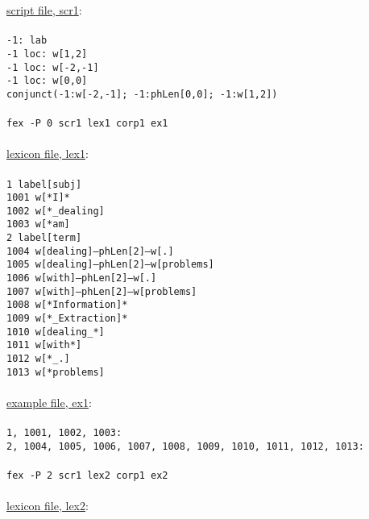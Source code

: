 \documentclass[11pt]{article}
\begin{document}
\underline{script file, scr1}: \\ \\
%
{\tt -1: lab \\
-1 loc: w[1,2] \\
-1 loc: w[-2,-1] \\
-1 loc: w[0,0] \\
conjunct(-1:w[-2,-1]; -1:phLen[0,0]; -1:w[1,2]) \\ \\
%
fex -P 0 scr1 lex1 corp1 ex1} \\ \\
%
\underline{lexicon file, lex1}: \\ \\
%
{\tt 1       label[subj]\\ 
1001    w[*I]*\\ 
1002    w[*\_dealing]\\ 
1003    w[*am]\\ 
2       label[term]\\ 
1004    w[dealing]--phLen[2]--w[.]\\ 
1005    w[dealing]--phLen[2]--w[problems]\\ 
1006    w[with]--phLen[2]--w[.]\\ 
1007    w[with]--phLen[2]--w[problems]\\ 
1008    w[*Information]*\\ 
1009    w[*\_Extraction]*\\ 
1010    w[dealing\_*]\\ 
1011    w[with*]\\ 
1012    w[*\_.]\\ 
1013    w[*problems]}\\ \\
%
\underline{example file, ex1}: \\ \\ 
%
{\tt 1, 1001, 1002, 1003: \\
2, 1004, 1005, 1006, 1007, 1008, 1009, 1010, 1011, 1012, 1013: } \\ \\ 
%
{\tt fex -P 2 scr1 lex2 corp1 ex2} \\ \\ 
%
\underline{lexicon file, lex2}: \\ \\ 
%
\end{document}

